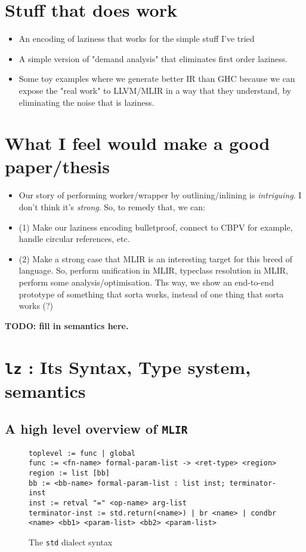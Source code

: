 \documentclass[sigplan,\review anonymous]{acmart}
\newcommand{\std}{\texttt{std} }
\newcommand{\mlir}{\texttt{MLIR} }
\newcommand{\lz}{\texttt{lz} }
\begin{document}
\section{Stuff that does work}
\begin{itemize}
\item An encoding of laziness that works for the simple stuff I've tried
\item A simple version of "demand analysis" that eliminates first order laziness.
\item Some toy examples where we generate better IR than GHC because we can
     expose the "real work" to LLVM/MLIR in a way that they understand, by
     eliminating the noise that is laziness.
\end{itemize}

\section{What I feel would make a good paper/thesis}
\begin{itemize}
\item Our story of performing worker/wrapper by outlining/inlining is
\emph{intriguing}. I don't think it's \emph{strong}. So, to remedy that, we can:
\item (1) Make our laziness encoding bulletproof, connect to CBPV for example,
          handle circular references, etc.
\item (2) Make a strong case that MLIR is an interesting target for this breed of language.
          So, perform unification in MLIR, typeclass resolution in MLIR, perform some
          analysis/optimisation. Ths way, we show an end-to-end prototype of something that
          sorta works, instead of one thing that sorta works (?)
\end{itemize}


\textbf{TODO: fill in semantics here.}
\section{\lz: Its Syntax, Type system, semantics}
\subsection{A high level overview of \mlir}

\begin{figure*}
\begin{verbatim}
toplevel := func | global
func := <fn-name> formal-param-list -> <ret-type> <region>
region := list [bb]
bb := <bb-name> formal-param-list : list inst; terminator-inst
inst := retval "=" <op-name> arg-list
terminator-inst := std.return(<name>) | br <name> | condbr <name> <bb1> <param-list> <bb2> <param-list>
\end{verbatim}
\caption{The \std dialect syntax}

\end{figure*}
\end{document}
